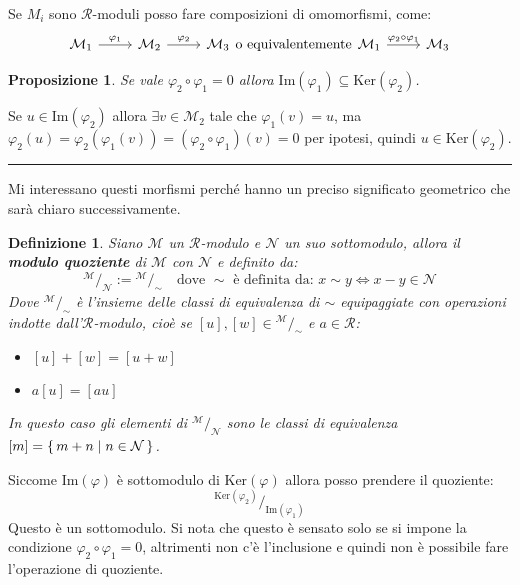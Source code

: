 \documentclass[10pt, twoside=false, x11names]{scrbook}
\newtheorem{proposition}[theorem]{Proposizione}
\newtheorem{definition}[theorem]{Definizione}
\newenvironment{proof}{{\textbf{Dimostrazione}:}}{\hfill\rule{2mm}{2mm} \newline}
\newcommand{\R}{\mathcal{R}}
\newcommand{\M}{\mathcal{M}}
\newcommand{\N}{\mathcal{N}}
\newcommand{\im}[1]{\mathrm{Im}( #1 )}
\renewcommand{\ker}[1]{\mathrm{Ker}( #1)}
\renewcommand{\phi}{\varphi}
\newcommand*\quot[2]{{^{\textstyle #1}\big/_{\textstyle #2}}}
\begin{document}
Se $ M_i $ sono $ \R $-moduli posso fare composizioni di omomorfismi, come:
\[
  \begin{tikzcd}
    \M_1 \arrow{r}{\phi_1} & \M_2 \arrow{r}{\phi_2} & \M_3
  \end{tikzcd}
  \text{o equivalentemente}
  \begin{tikzcd}
    \M_1 \arrow{r}{\phi_2 \circ \phi_1} & \M_3
  \end{tikzcd}
\]
\begin{proposition}
Se vale $ \phi_2 \circ \phi_1 = 0 $ allora $ \im{\phi_1} \subseteq \ker{\phi_2} $.
\end{proposition}
\begin{proof}
  Se $ u \in \im {\phi_2} $ allora $ \exists v \in \M_2 $ tale che $ \phi_1(v) = u $,
  ma $ \phi_2(u) = \phi_2(\phi_1(v)) = (\phi_2 \circ \phi_1)(v) = 0 $ per ipotesi, quindi $ u \in \ker{\phi_2} $.
\end{proof}

Mi interessano questi morfismi perché hanno un preciso significato geometrico che
sarà chiaro successivamente.

\begin{definition}
  Siano $ \M $ un $ \R $-modulo e $ \N $ un suo sottomodulo, allora il \textbf{modulo
  quoziente}  di $ \M $ con $ \N $ e definito da:
  \[
    \quot{\M}{\N} := \quot{\M}{\sim} \quad \text{dove } \sim \text{ è definita da: } x \sim y \Leftrightarrow x - y \in \N
  \]
  Dove $ \quot{\M}{\sim} $ è l'insieme delle classi di equivalenza di $ \sim $ equipaggiate
  con operazioni indotte dall'$ \R $-modulo, cioè se $ [u], [w] \in \quot{\M}{\sim} $ e $ a \in \R $:
  \begin{itemize}
  \item $ [u] + [w] = [u + w] $
  \item $ a [u] = [au] $
  \end{itemize}
  In questo caso gli elementi di $ \quot{\M}{\N} $ sono le classi di equivalenza
  $ [m] = \set{ m + n | n \in \N } $.
\end{definition}

Siccome $ \im{\phi} $ è sottomodulo di $ \ker{\phi} $ allora posso prendere
il quoziente:
\[
  \quot{\ker{\phi_2}}{\im{\phi_1}}
\]
Questo è un sottomodulo. Si nota che questo è sensato solo se si impone la condizione
$ \phi_2 \circ \phi_1 = 0 $, altrimenti non c'è l'inclusione e quindi non è possibile fare l'operazione
di quoziente.
\end{document}
